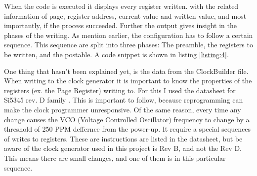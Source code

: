 When the code is executed it displays every register written. with the related information of page, register address, current value and written value, and most importantly, if the process succeeded. Further the output gives insight in the phases of the writing. As mention earlier, the configuration has to follow a certain sequence. This sequence are split into three phases: The preamble, the registers to be written, and the postable. A code snippet is shown in listing \ref{listing:4}.


One thing that hasn't been explained yet, is the data from the ClockBuilder file. When writing to the clock generator it is important to know the properties of the registers (ex. the Page Register) writing to. For this I used the datasheet for Si5345 rev. D family \cite{Si5345Si17:online}. This is important to follow, because reprogramming can make the clock programmer unresponsive. Of the same reason, every time any change causes the VCO (Voltage Controlled Oscillator) frequency to change by a threshold of 250 PPM deffernce from the power-up. It require a special sequences of writes to registers. These are instructions are listed in the datasheet, but be aware of the clock generator used in this project is Rev B, and not the Rev D. This means there are small changes, and one of them is in this particular sequence.



